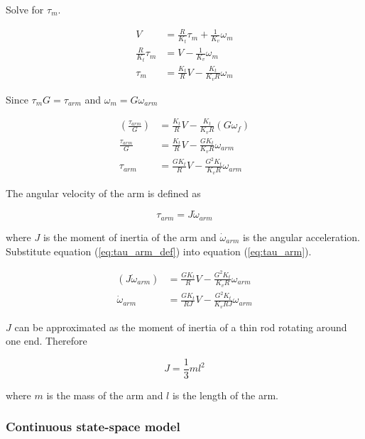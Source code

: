 Solve for $\tau_m$.

\begin{align*}
  V &= \frac{R}{K_t} \tau_m + \frac{1}{K_v} \omega_m \\
  \frac{R}{K_t} \tau_m &= V - \frac{1}{K_v} \omega_m \\
  \tau_m &= \frac{K_t}{R} V - \frac{K_t}{K_v R} \omega_m
\end{align*}

Since $\tau_m G = \tau_{arm}$ and $\omega_m = G \omega_{arm}$

\begin{align}
  \left(\frac{\tau_{arm}}{G}\right) &= \frac{K_t}{R} V -
    \frac{K_t}{K_v R} (G \omega_f) \nonumber \\
  \frac{\tau_{arm}}{G} &= \frac{K_t}{R} V - \frac{G K_t}{K_v R} \omega_{arm}
    \nonumber \\
  \tau_{arm} &= \frac{G K_t}{R} V - \frac{G^2 K_t}{K_v R} \omega_{arm}
    \label{eq:tau_arm}
\end{align}

The angular velocity of the arm is defined as

\begin{equation}
  \tau_{arm} = J \dot{\omega}_{arm} \label{eq:tau_arm_def}
\end{equation}

where $J$ is the moment of inertia of the arm and $\dot{\omega}_{arm}$ is the
angular acceleration. Substitute equation (\ref{eq:tau_arm_def}) into equation
(\ref{eq:tau_arm}).

\begin{align}
  (J \dot{\omega}_{arm}) &= \frac{G K_t}{R} V - \frac{G^2 K_t}{K_v R}
    \omega_{arm} \nonumber \\
  \dot{\omega}_{arm} &= \frac{G K_t}{RJ} V - \frac{G^2 K_t}{K_v RJ} \omega_{arm}
    \label{eq:dot_omega_arm}
\end{align}

$J$ can be approximated as the moment of inertia of a thin rod rotating around
one end. Therefore

\begin{equation}
  J = \frac{1}{3}ml^2
\end{equation}

where $m$ is the mass of the arm and $l$ is the length of the arm.

\subsubsection{Continuous state-space model}

